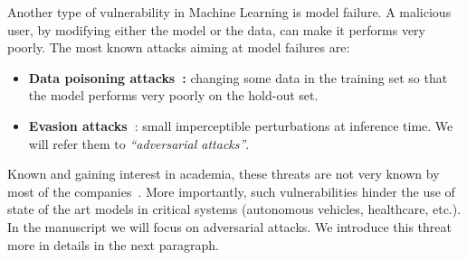     
    
Another type of vulnerability in Machine Learning is model failure. A malicious user, by modifying either the model or the data, can make it performs very poorly. The most known attacks aiming at model failures are:
\begin{itemize}
    \item \textbf{Data poisoning attacks~\citep{kearns1993learning}:} changing some data in the training set so that the model performs very poorly on the hold-out set. 
    \item \textbf{Evasion attacks~\citep{biggio2013evasion,Szegedy2013IntriguingPO}}: small imperceptible perturbations at inference time. We will refer them to \emph{``adversarial attacks''}.
\end{itemize}
    
Known and gaining interest in academia, these threats are not very known by most of the companies~\cite{kumar2020adversarial}. More importantly, such vulnerabilities  hinder the use of state of the art models in critical systems (autonomous vehicles, healthcare, etc.). In the manuscript we will focus on adversarial attacks.  We introduce this threat more in details in the next paragraph.


